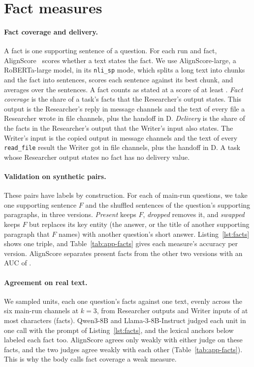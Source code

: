 \documentclass[sigplan,10pt,nonacm,review,anonymous]{acmart}
\begin{document}
\section{Fact measures}
\label{app:facts}

\paragraph{Fact coverage and delivery.} A fact is one supporting sentence of a question. For each run and fact,
AlignScore~\cite{alignscore} scores whether a text states the fact. We use AlignScore-large, a RoBERTa-large
model, in its \texttt{nli\_sp} mode, which splits a long text into chunks and the fact into sentences, scores each
sentence against its best chunk, and averages over the sentences. A fact counts as stated at a score of at least \nAppThreshold. \emph{Fact coverage}
is the share of a task's facts that the Researcher's output states. This output is the Researcher's reply in
message channels and the text of every file a Researcher wrote in file channels, plus the handoff in D.
\emph{Delivery} is the share of the facts in the Researcher's output that the Writer's input also states. The
Writer's input is the copied output in message channels and the text of every \texttt{read\_file} result the
Writer got in file channels, plus the handoff in D. A task whose Researcher output states no fact has no
delivery value.

\paragraph{Validation on synthetic pairs.} These pairs have labels by construction. For each of
\nAppSynPerKind main-run questions, we take one supporting sentence $F$ and the shuffled sentences of the
question's supporting paragraphs, in three versions. \emph{Present} keeps $F$, \emph{dropped} removes it, and
\emph{swapped} keeps $F$ but replaces its key entity (the answer, or the title of another supporting paragraph
that $F$ names) with another question's short answer. Listing~\ref{lst:facts} shows one triple, and
Table~\ref{tab:app-facts} gives each measure's accuracy per version. AlignScore separates present facts from
the other two versions with an AUC of \nSynAAuc.

\paragraph{Agreement on real text.} We sampled \nAppRealUnits units, each one question's facts against one text,
evenly across the six main-run channels at $k=3$, from Researcher outputs and Writer inputs of at most
\nAppRealMaxChars characters (\nAppRealFacts facts). Qwen3-8B and Llama-3-8B-Instruct judged each unit in one
call with the prompt of Listing~\ref{lst:facts}, and the lexical anchors below labeled each fact too.
AlignScore agrees only weakly with either judge on these facts, and the two judges agree weakly with each other
(Table~\ref{tab:app-facts}). This is why the body calls fact coverage a weak measure.
\end{document}
